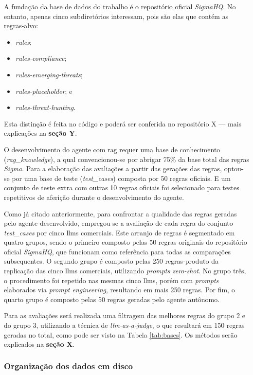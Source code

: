 A fundação da base de dados do trabalho é o repositório oficial \textit{SigmaHQ}.
No entanto, apenas cinco subdiretórios interessam, pois são elas que contém as regras-alvo: 
\begin{itemize}
	\item \textit{rules};
	\item \textit{rules-compliance};
	\item \textit{rules-emerging-threats};
	\item \textit{rules-placeholder}; e
	\item \textit{rules-threat-hunting}.
\end{itemize}
Esta distinção é feita no código e poderá ser conferida no repositório X --- mais explicações na \textbf{seção Y}.

O desenvolvimento do agente com \gls{rag} requer uma base de conhecimento (\textit{rag\_knowledge}), a qual convencionou-se por abrigar 75\% da base total das regras \textit{Sigma}.
Para a elaboração das avaliações a partir das gerações das regras, optou-se por uma base de teste (\textit{test\_cases}) composta por 50 regras oficiais.
E um conjunto de teste extra com outras 10 regras oficiais foi selecionado para testes repetitivos de aferição durante o desenvolvimento do agente.

Como já citado anteriormente, para confrontar a qualidade das regras geradas pelo agente desenvolvido, empregou-se a avaliação de cada regra do conjunto \textit{test\_cases} por cinco \gls{llm}s comerciais.
Este arranjo de regras é segmentado em quatro grupos, sendo o primeiro composto pelas 50 regras originais do repositório oficial \textit{SigmaHQ}, que funcionam como referência para todas as comparações subsequentes. 
O segundo grupo é composto pelas 250 regras-produto da replicação das cinco \gls{llm}s comerciais, utilizando \textit{prompts} \textit{zero-shot}.
No grupo três, o procedimento foi repetido nas mesmas cinco \gls{llm}s, porém com \textit{prompts} elaborados via \textit{prompt engineering}, resultando em mais 250 regras. 
Por fim, o quarto grupo é composto pelas 50 regras geradas pelo agente autônomo.

Para as avaliações será realizada uma filtragem das melhores regras do grupo 2 e do grupo 3, utilizando a técnica de \textit{\gls{llm}-as-a-judge}, o que resultará em 150 regras geradas no total, como pode ser visto na Tabela \ref{tab:bases}. Os métodos serão explicados na \textbf{seção X}.

\subsubsection{Organização dos dados em disco}

